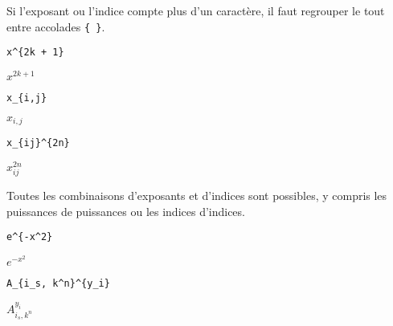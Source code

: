Si l'exposant ou l'indice compte plus d'un caractère, il faut
regrouper le tout entre accolades \verb={ }=.
\begin{demo}
  \begin{minipage}{0.3\linewidth}
    \begin{texample}[0.6\linewidth]
\begin{lstlisting}
x^{2k + 1}
\end{lstlisting}
      \producing\strut $x^{2k + 1}$
    \end{texample}
  \end{minipage}
  \quad
  \begin{minipage}{0.3\linewidth}
    \begin{texample}[0.6\linewidth]
\begin{lstlisting}
x_{i,j}
\end{lstlisting}
      \producing\strut $x_{i,j}$
    \end{texample}
  \end{minipage}
  \quad
  \begin{minipage}{0.3\linewidth}
    \begin{texample}[0.63\linewidth]
\begin{lstlisting}
x_{ij}^{2n}
\end{lstlisting}
      \producing\strut $x_{ij}^{2n}$
    \end{texample}
  \end{minipage}
\end{demo}

Toutes les combinaisons d'exposants et d'indices sont possibles, y
compris les puissances de puissances ou les indices d'indices.
\begin{demo}
  \begin{minipage}{0.3\linewidth}
    \begin{texample}[0.6\linewidth]
\begin{lstlisting}
e^{-x^2}
\end{lstlisting}
      \producing\strut $e^{-x^2}$
    \end{texample}
  \end{minipage}
  \quad
  \begin{minipage}{0.6\linewidth}
    \begin{texample}[0.6\linewidth]
\begin{lstlisting}
A_{i_s, k^n}^{y_i}
\end{lstlisting}
      \producing\strut $A_{i_s,k^n}^{y_i}$
    \end{texample}
  \end{minipage}
  \quad \mbox{} %
\end{demo}

